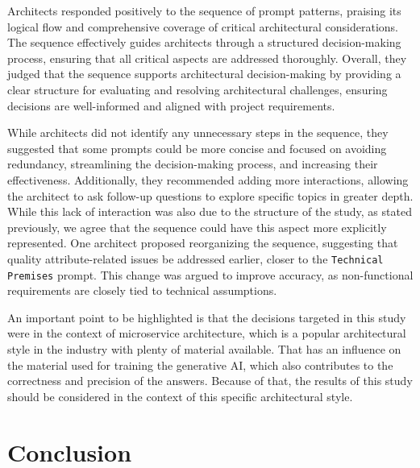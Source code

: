\documentclass[runningheads]{llncs}
\begin{document}
Architects responded positively to the sequence of prompt patterns, praising its logical flow and comprehensive coverage of critical architectural considerations. The sequence effectively guides architects through a structured decision-making process, ensuring that all critical aspects are addressed thoroughly. Overall, they judged that the sequence supports architectural decision-making by providing a clear structure for evaluating and resolving architectural challenges, ensuring decisions are well-informed and aligned with project requirements.

While architects did not identify any unnecessary steps in the sequence, they suggested that some prompts could be more concise and focused on avoiding redundancy, streamlining the decision-making process, and increasing their effectiveness. Additionally, they recommended adding more interactions, allowing the architect to ask follow-up questions to explore specific topics in greater depth. While this lack of interaction was also due to the structure of the study, as stated previously, we agree that the sequence could have this aspect more explicitly represented. One architect proposed reorganizing the sequence, suggesting that quality attribute-related issues be addressed earlier, closer to the \texttt{Technical Premises} prompt. This change was argued to improve accuracy, as non-functional requirements are closely tied to technical assumptions.

An important point to be highlighted is that the decisions targeted in this study were in the context of microservice architecture, which is a popular architectural style in the industry with plenty of material available. That has an influence on the material used for training the generative AI, which also contributes to the correctness and precision of the answers. Because of that, the results of this study should be considered in the context of this specific architectural style. 


\section{Conclusion}
\end{document}
